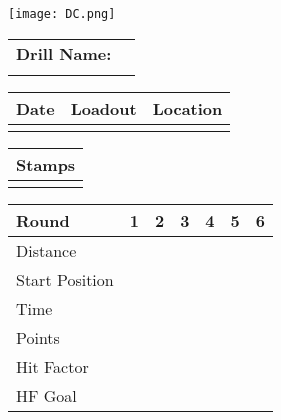 \documentclass[../Cover.tex]{subfiles}
\begin{document}
	\begin{minipage}[t][0.15\textheight][t]{0.1\textwidth} 
		\texttt{[image: DC.png]}
	\end{minipage}
	\hfill
	\begin{minipage}[t][0.15\textheight][t]{0.8\textwidth}
		\begin{tabular}{ p{} l  }
			\\		
			\textbf{Drill Name:} \\
			\\[0.03\textheight]
			\hline
		\end{tabular}
		\quad
		\small \begin{tabular}{ | p{} | p{} | p{} |}
			\hline
			\rowcolor[HTML]{C0C0C0}Date & Loadout & Location\\ 
			\hline
			&  &  \\ 
			\hline
		\end{tabular}
	\end{minipage}
	
	\begin{tabular}{p{}|}
		Stamps \\
		\hline
		\\[0.65\textheight]
	\end{tabular}
	\quad
	\begin{tabular}{ | p{} | p{} | p{} | p{} | p{} | p{} | p{} |}
		\hline
		\rowcolor[HTML]{C0C0C0}Round & 1 & 2 & 3 & 4 & 5 & 6 \\
		\hline
		\cellcolor[HTML]{C0C0C0}\tiny Distance & & & & & & \\[0.05\textheight]
		\hline
		\cellcolor[HTML]{C0C0C0}\tiny Start Position & & & & & & \\[0.05\textheight]
		\hline
		\cellcolor[HTML]{C0C0C0}\tiny Time & & & & & & \\[0.05\textheight]
		\hline
		\cellcolor[HTML]{C0C0C0}\tiny Points & & & & & & \\[0.05\textheight]
		\hline
		\cellcolor[HTML]{C0C0C0}\tiny Hit Factor & & & & & & \\[0.05\textheight]
		\hline
		\cellcolor[HTML]{C0C0C0}\tiny HF Goal & & & & & & \\[0.05\textheight]
		\hline
	\end{tabular}
\end{document}
